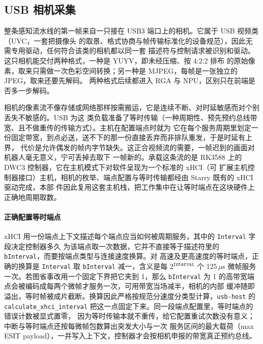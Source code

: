 \subsection{USB 相机采集}\label{sec:camera}

整条感知流水线的第一帧来自一只接在 USB3 端口上的相机。它属于 USB 视频类（UVC，一套把摄像头
的取景、格式协商与帧传输标准化的设备规范），因此无需专用驱动，任何符合该类的相机都以同一套
描述符与控制请求被识别和驱动。这只相机能交付两种格式，一种是 YUYV，即未经压缩、按 4:2:2 排布
的原始像素，取来只需做一次色彩空间转换；另一种是 MJPEG，每帧是一张独立的 JPEG，取来还要先解码。
两种格式后续都进入 RGA 与 NPU，区别只在前端是否多一步解码。

相机的像素流不像存储或网络那样按需搬运，它是连续不断、对时延敏感而对个别丢失不敏感的。USB 为这
类负载准备了等时传输（一种周期性、预先预约总线带宽、且不做重传的传输方式）。主机在配置端点时就为
它在每个服务周期里划定一份固定带宽，到点必送，送不下的那一份直接丢弃而非排队重发，于是时延有上界，
代价是允许偶发的帧内字节缺失。这正合视频流的需要，一帧迟到的画面对机器人毫无意义，宁可丢掉去取下
一帧新的。承载这条流的是 RK3588 上的 DWC3 控制器，它在主机模式下对软件呈现为一个标准的 xHCI（可
扩展主机控制器接口）主机，相机的枚举、端点配置与等时传输都经由 Starry 既有的 xHCI 驱动完成，本部
件因此复用这套主机栈，把工作集中在让等时端点在这块硬件上正确地周期取数。


\paragraph{正确配置等时端点}
xHCI 用一份端点上下文描述每个端点应当如何被周期服务，其中的 \texttt{Interval} 字段决定控制器多久
为该端点取一次数据，它并不直接等于描述符里的 \texttt{bInterval}，而要按端点类型与连接速度换算。对
高速及更高速度的等时端点，正确的换算是 \texttt{Interval} 取 \texttt{bInterval} 减一，含义是每
$2^{\texttt{Interval}}$ 个 125\,$\mu$s 微帧服务一次。若图省事改用一个固定下界把它夹到 1，那么
\texttt{bInterval} 为 1 的高带宽端点会被编码成每两个微帧才服务一次，可用带宽当场减半，相机的内部
缓冲随即溢出，等时帧被成片截断。换算因此严格按规范分速度分类型计算，\texttt{usb-host} 的
\texttt{calculate\_xhci\_interval} 把这一点固定下来。同一段端点配置里，等时端点的错误计数被显式置零，
因为等时传输本就不重传，给它配置重试次数没有意义；中断与等时端点还按每微帧包数算出突发大小与一次
服务区间的最大载荷（max ESIT payload），一并写入上下文，控制器才会按相机申报的带宽真正预约总线。


